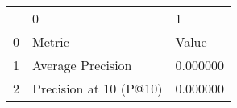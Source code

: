 \begin{tabular}{lll}
 & 0 & 1 \\
0 & Metric & Value \\
1 & Average Precision & 0.000000 \\
2 & Precision at 10 (P@10) & 0.000000 \\
\end{tabular}
